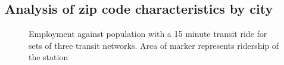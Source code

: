 \documentclass[11pt]{article}
\begin{document}
\subsection{Analysis of zip code characteristics by city}
\begin{figure}
\centering
{}

\vspace{-15pt}
\captionsetup{singlelinecheck=off, justification=centering}
\caption[]{Employment against population with a 15 minute transit ride for sets of three transit networks.\linebreak
Area of marker represents ridership of the station}\label{fig:localvars}
\end{figure}
\end{document}
